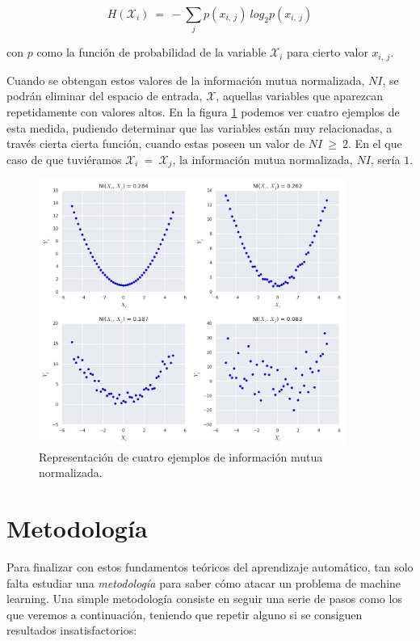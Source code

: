 $$
H(\mathcal{X}_{i})\:=\:-\sum_{j}p(x_{i,\:j})\:log_{2}p(x_{i,\:j})
$$

\noindent
con $p$ como la función de probabilidad de la variable $\mathcal{X}_{i}$ para cierto valor $x_{i,\:j}$.

Cuando se obtengan estos valores de la información mutua normalizada, $NI$, se podrán eliminar del espacio de entrada, $\mathcal{X}$, aquellas variables que aparezcan repetidamente con valores altos. En la figura \ref{fig:3.12} podemos ver cuatro ejemplos de esta medida, pudiendo determinar que las variables están muy relacionadas, a través cierta cierta función, cuando estas poseen un valor de $NI\:\geq\:2$. En el que caso de que tuviéramos $\mathcal{X}_{i}\:=\:\mathcal{X}_{j}$, la información mutua normalizada, $NI$, sería $1$.

\begin{figure}[H]
  \centering
  \includegraphics[width=100mm]{figures/ch_03/mutual_information_example.png}
  \caption{Representación de cuatro ejemplos de información mutua normalizada.}
  \label{fig:3.12}
\end{figure}

\section{Metodología} \label{sec:3.4}

Para finalizar con estos fundamentos teóricos del aprendizaje automático, tan solo falta estudiar una \emph{metodología} para saber cómo atacar un problema de machine learning. Una simple metodología consiste en seguir una serie de pasos como los que veremos a continuación, teniendo que repetir alguno si se consiguen resultados insatisfactorios:

